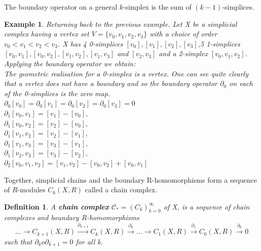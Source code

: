 \documentclass{article}
\newcommand{\be}{\begin{equation}}
\newcommand{\ee}{\end{equation}}
\newtheorem{definition}[theorem]{Definition}
\newtheorem{example}[theorem]{Example}
\begin{document}
The boundary operator on a general $k$-simplex is the sum of $(k-1)$-simplices.
\begin{example}
Returning back to the previous example. Let X be a simplicial complex having a vertex set $V =\{v_0, v_1, v_2, v_3\}$ with a choice of order $v_0 < v_1 < v_2 < v_3$. X has 4 0-simplices $[v_0], [v_1], [v_2], [v_3]$,5 1-simplices $[v_0,v_1],[v_0,v_2],[v_1,v_2],[v_1,v_3]$ and $[v_2,v_3]$ and a 2-simplex $[v_0, v_1, v_2]$. Applying the boundary operator we obtain:\\
The geometric realisation for a 0-simplex is a vertex. One can see quite clearly that a vertex does not have a boundary and so the boundary operator $\partial_0$ on each of the 0-simplices is the zero map.\\
$\partial_0[v_0] = \partial_0[v_1]= \partial_0[v_2]= \partial_0[v_3] = 0$ \\
$\partial_1[v_0,v_1] = [v_1] - [v_0],$\\
$\partial_1[v_0,v_2] = [v_2]- [v_0],$ \\
$\partial_1[v_1,v_2] = [v_2] - [v_1],$\\
$\partial_1[v_1,v_3] = [v_3] - [v_1],$\\
$\partial_1[v_2,v_3] = [v_3]- [v_2], $ \\
$\partial_2[v_0,v_1,v_2] = [v_1,v_2] - [v_0,v_2] + [v_0,v_1]$
\end{example}
Together, simplicial chains and the boundary R-homomorphisms form a sequence of $R$-modules $C_k(X,R)$ called a chain complex.
\begin{definition} A \textbf{chain complex }$\mathcal{C}_{*} = (C_{k})^{\infty}_{k=0}$ of X, is a sequence of chain complexes and boundary R-homomorphisms
\be
...\rightarrow C_{k+1}(X,R) \xrightarrow{\partial_{k+1}} C_k(X,R)\xrightarrow{\partial_k}...\rightarrow C_1(X,R)\xrightarrow{\partial_1}C_0(X,R)\xrightarrow{\partial_0} 0
\ee
such that $\partial_k o \partial_{k+1} = 0$ for all k.
\end{definition}
\end{document}

